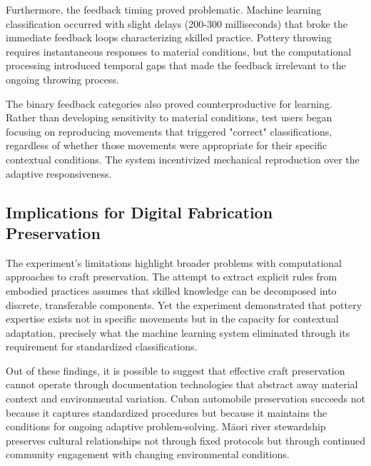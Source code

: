 \vspace{0.5cm}

Furthermore, the feedback timing proved problematic. Machine learning classification occurred with slight delays (200-300 milliseconds) that broke the immediate feedback loops characterizing skilled practice. Pottery throwing requires instantaneous responses to material conditions, but the computational processing introduced temporal gaps that made the feedback irrelevant to the ongoing throwing process.

\vspace{0.5cm}

The binary feedback categories also proved counterproductive for learning. Rather than developing sensitivity to material conditions, test users began focusing on reproducing movements that triggered "correct" classifications, regardless of whether those movements were appropriate for their specific contextual conditions. The system incentivized mechanical reproduction over the adaptive responsiveness.







\subsection{Implications for Digital Fabrication Preservation}

The experiment's limitations highlight broader problems with computational approaches to craft preservation. The attempt to extract explicit rules from embodied practices assumes that skilled knowledge can be decomposed into discrete, transferable components. Yet the experiment demonstrated that pottery expertise exists not in specific movements but in the capacity for contextual adaptation, precisely what the machine learning system eliminated through its requirement for standardized classifications.

\vspace{0.5cm}

Out of these findings, it is possible to suggest that effective craft preservation cannot operate through documentation technologies that abstract away material context and environmental variation. Cuban automobile preservation succeeds not because it captures standardized procedures but because it maintains the conditions for ongoing adaptive problem-solving. Māori river stewardship preserves cultural relationships not through fixed protocols but through continued community engagement with changing environmental conditions.

